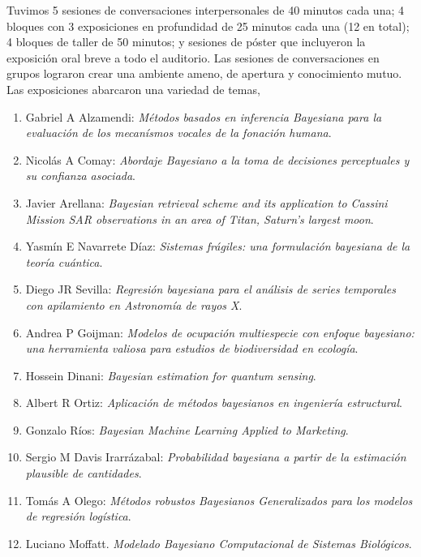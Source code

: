 \documentclass[a4paper,11pt]{book}
\theoremstyle{definition}
\begin{document}

Tuvimos 5 sesiones de conversaciones interpersonales de 40 minutos cada una; 4 bloques con 3 exposiciones en profundidad de 25 minutos cada una (12 en total); 4 bloques de taller de 50 minutos; y sesiones de p\'oster que incluyeron la exposici\'on oral breve a todo el auditorio.
%
Las sesiones de conversaciones en grupos lograron crear una ambiente ameno, de apertura y conocimiento mutuo.
%
Las exposiciones abarcaron una variedad de temas,
%
\begin{enumerate} \setlength\itemsep{-0.05cm} \small
\item Gabriel A Alzamendi: \emph{M\'etodos basados en inferencia Bayesiana para la evaluaci\'on de los mecan\'ismos vocales de la fonaci\'on humana}.

\item Nicol\'as A Comay: \emph{Abordaje Bayesiano a la toma de decisiones perceptuales y su confianza asociada}.

\item Javier Arellana: \emph{Bayesian retrieval scheme and its application to Cassini Mission SAR observations in an area of Titan, Saturn's largest moon}.


\item Yasm\'in E Navarrete D\'iaz: \emph{Sistemas fr\'agiles: una formulaci\'on bayesiana de la teor\'ia cu\'antica}.


\item Diego JR Sevilla: \emph{Regresi\'on bayesiana para el an\'alisis de series temporales con apilamiento en Astronom\'ia de rayos X}.

\item Andrea P Goijman: \emph{Modelos de ocupaci\'on multiespecie con enfoque bayesiano: una herramienta valiosa para estudios de biodiversidad en ecolog\'ia}.

\item Hossein Dinani: \emph{Bayesian estimation for quantum sensing}.


\item Albert R Ortiz: \emph{Aplicaci\'on de m\'etodos bayesianos en ingenier\'ia estructural}.

\item Gonzalo R\'ios: \emph{Bayesian Machine Learning Applied to Marketing}.

\item Sergio M Davis Irarr\'azabal: \emph{Probabilidad bayesiana a partir de la estimaci\'on plausible de cantidades}.

\item Tom\'as A Olego: \emph{M\'etodos robustos Bayesianos Generalizados para los modelos de regresi\'on log\'istica}.

\item Luciano Moffatt. \emph{Modelado Bayesiano Computacional de Sistemas Biol\'ogicos}.
\end{enumerate}
\end{document}
